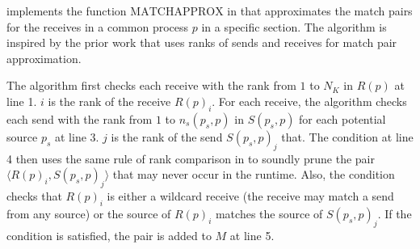  implements the function $\mathrm{MATCHAPPROX}$ in  that approximates the match pairs for the receives in a common process $p$ in a specific section. The algorithm is inspired by the prior work \cite{} that uses ranks of sends and receives for match pair approximation. 

The algorithm first checks each receive with the rank from $1$ to $N_K$ in $R(p)$ at line 1. $i$ is the rank of the receive $R(p)_i$. 
For each receive, the algorithm checks each send with the rank from $1$ to $n_s(p_s,p)$ in $S(p_s,p)$ for each potential source $p_s$ at line 3.
$j$ is the rank of the send $S(p_s,p)_j$ that. The condition at line 4 then uses the same rule of rank comparison in \cite{} to soundly prune the pair $\langle R(p)_i,S(p_s,p)_j\rangle$ that may never occur in the runtime. Also, the condition checks that $R(p)_i$ is either a wildcard receive (the receive may match a send from any source) or the source of $R(p)_i$ matches the source of $S(p_s,p)_j$.
If the condition is satisfied, the pair is added to $M$ at line 5. 







